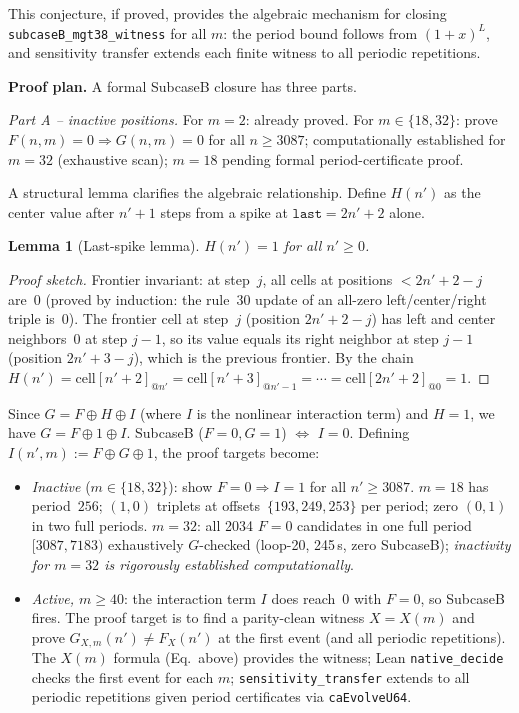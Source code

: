\documentclass[11pt]{article}
\theoremstyle{plain}
\newtheorem{lemma}[theorem]{Lemma}
\theoremstyle{definition}
\begin{document}
This conjecture, if proved, provides the algebraic mechanism for closing
\texttt{subcaseB\_mgt38\_witness} for all $m$: the period bound follows from $(1+x)^L$,
and sensitivity transfer extends each finite witness to all periodic repetitions.

\textbf{Proof plan.}  A formal SubcaseB closure has three parts.

\emph{Part A -- inactive positions.}  For $m=2$: already proved.  For $m \in \{18, 32\}$:
prove $F(n,m)=0 \Rightarrow G(n,m)=0$ for all $n \geq 3087$;
computationally established for $m=32$ (exhaustive scan); $m=18$ pending formal period-certificate proof.

A structural lemma clarifies the algebraic relationship.  Define
$H(n')$ as the center value after $n'{+}1$ steps from a spike at
$\mathtt{last}=2n'{+}2$ alone.

\begin{lemma}[Last-spike lemma]
$H(n') = 1$ for all $n' \geq 0$.
\end{lemma}
\begin{proof}[Proof sketch]
Frontier invariant: at step~$j$, all cells at positions $< 2n'{+}2-j$ are~$0$
(proved by induction: the rule~30 update of an all-zero left/center/right triple is~$0$).
The frontier cell at step~$j$ (position $2n'{+}2-j$) has left and center neighbors~$0$
at step $j{-}1$, so its value equals its right neighbor at step $j{-}1$ (position $2n'{+}3-j$),
which is the previous frontier.  By the chain
$H(n') = \text{cell}[n'{+}2]_{@n'} = \text{cell}[n'{+}3]_{@n'-1} = \cdots = \text{cell}[2n'{+}2]_{@0} = 1$.
\end{proof}

Since $G = F \oplus H \oplus I$ (where $I$ is the nonlinear interaction term) and $H=1$,
we have $G = F \oplus 1 \oplus I$.  SubcaseB ($F=0, G=1$) $\Leftrightarrow$ $I=0$.
Defining $I(n',m) := F \oplus G \oplus 1$, the proof targets become:
\begin{itemize}
  \item \emph{Inactive} ($m \in \{18, 32\}$): show $F=0 \Rightarrow I=1$ for all $n' \geq 3087$.
    $m=18$ has period~$256$; $(1,0)$ triplets at offsets~$\{193, 249, 253\}$ per period;
    zero $(0,1)$ in two full periods.
    $m=32$: all 2034 $F{=}0$ candidates in one full period $[3087,7183)$
    exhaustively $G$-checked (loop-20, 245\,s, zero SubcaseB);
    \emph{inactivity for $m=32$ is rigorously established computationally}.
  \item \emph{Active, $m \geq 40$}: the interaction term $I$ does reach~$0$ with $F=0$,
    so SubcaseB fires.  The proof target is to find a parity-clean witness $X=X(m)$ and
    prove $G_{X,m}(n') \neq F_X(n')$ at the first event (and all periodic repetitions).
    The $X(m)$ formula (Eq.~above) provides the witness; Lean \texttt{native\_decide}
    checks the first event for each $m$; \texttt{sensitivity\_transfer} extends to
    all periodic repetitions given period certificates via \texttt{caEvolveU64}.
\end{itemize}
\end{document}
